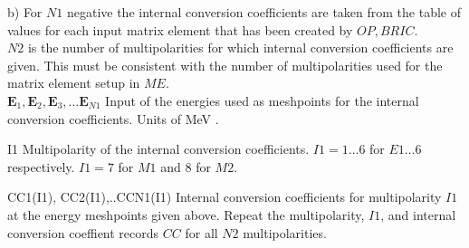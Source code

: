 \documentclass[10pt]{article}
\begin{document}
b) For $N 1$ negative the internal conversion coefficients are taken from the table of values for each input matrix element that has been created by $O P, B R I C$.\\
$N 2$ is the number of multipolarities for which internal conversion coefficients are given. This must be consistent with the number of multipolarities used for the matrix element setup in $M E$.\\
$\mathbf{E}_{1}, \mathbf{E}_{2}, \mathbf{E}_{3}, \ldots \mathbf{E}_{N 1}$ Input of the energies used as meshpoints for the internal conversion coefficients. Units of MeV .

I1 Multipolarity of the internal conversion coefficients. $I 1=1 \ldots 6$ for $E 1 \ldots 6$ respectively. $I 1=7$ for $M 1$ and 8 for $M 2$.

CC1(I1), CC2(I1),..CCN1(I1) Internal conversion coefficients for multipolarity $I 1$ at the energy meshpoints given above. Repeat the multipolarity, $I 1$, and internal conversion coeffient records $C C$ for all $N 2$ multipolarities.
\end{document}
